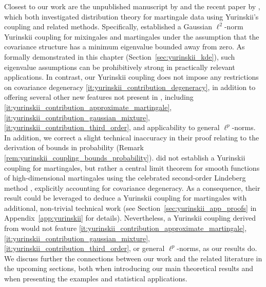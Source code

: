 \documentclass[11pt,lof]{puthesis}
\theoremstyle{break}
\theoremstyle{proof}
\begin{document}
Closest to our work are the unpublished manuscript by \citet{belloni2018high}
and the recent paper by \citet{li2020uniform}, which both investigated
distribution theory for martingale data using Yurinskii's coupling and related
methods. Specifically, \citet{li2020uniform} established a Gaussian
$\ell^2$-norm Yurinskii coupling for mixingales and martingales under the
assumption that the covariance structure has a minimum eigenvalue bounded away
from zero. As formally demonstrated in this chapter
(Section~\ref{sec:yurinskii_kde}),
such eigenvalue assumptions can be prohibitively strong in practically relevant
applications. In contrast, our Yurinskii coupling does not impose any
restrictions on covariance degeneracy
\ref{it:yurinskii_contribution_degeneracy}, in
addition to offering several other new features not present in
\citet{li2020uniform}, including
\ref{it:yurinskii_contribution_approximate_martingale},
\ref{it:yurinskii_contribution_gaussian_mixture},
\ref{it:yurinskii_contribution_third_order}, and
applicability to general $\ell^p$-norms. In addition, we correct a slight
technical inaccuracy in their proof relating to the derivation of bounds in
probability (Remark \ref{rem:yurinskii_coupling_bounds_probability}).
\citet{belloni2018high} did not establish a Yurinskii coupling for martingales,
but rather a central limit theorem for smooth functions of high-dimensional
martingales using the celebrated second-order Lindeberg method
\citep[see][and references therein]{chatterjee2006generalization}, explicitly
accounting for covariance degeneracy. As a consequence, their result could be
leveraged to deduce a Yurinskii coupling for martingales with additional,
non-trivial technical work (see Section~\ref{sec:yurinskii_app_proofs}
in Appendix~\ref{app:yurinskii} for details).
Nevertheless, a Yurinskii coupling derived from
\citet{belloni2018high} would not feature
\ref{it:yurinskii_contribution_approximate_martingale},
\ref{it:yurinskii_contribution_gaussian_mixture},
\ref{it:yurinskii_contribution_third_order}, or
general $\ell^p$-norms, as our results do. We discuss further the connections
between our work and the related literature in the upcoming sections, both when
introducing our main theoretical results and when presenting the examples and
statistical applications.
\end{document}
